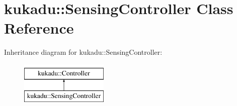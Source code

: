 \hypertarget{classkukadu_1_1SensingController}{\section{kukadu\-:\-:Sensing\-Controller Class Reference}
\label{classkukadu_1_1SensingController}
}
Inheritance diagram for kukadu\-:\-:Sensing\-Controller\-:\begin{figure}[H]
\begin{center}
\leavevmode
\includegraphics[height=2.000000cm]{classkukadu_1_1SensingController}
\end{center}
\end{figure}
